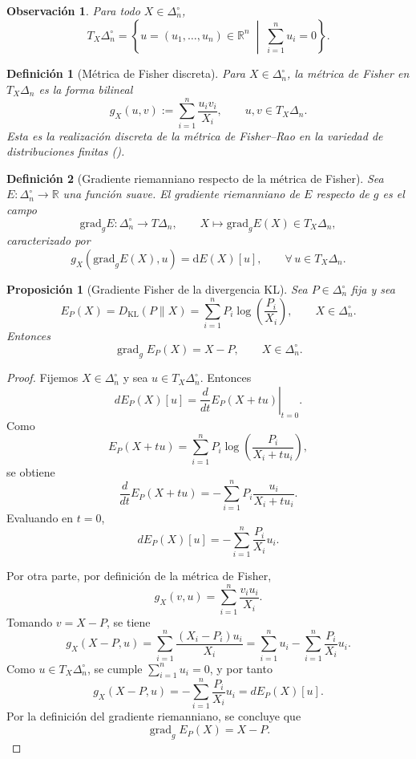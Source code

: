 ﻿\documentclass[12pt]{article}
\newtheorem{definicion}{Definición}[section]
\newtheorem{proposicion}{Proposición}[section]
\newtheorem{observacion}{Observación}[section]
\begin{document}
\begin{observacion}
Para todo $X\in\Delta_n^\circ$,
\[
T_X\Delta_n^\circ
=
\left\{
u=(u_1,\dots,u_n)\in\mathbb R^n
\;\middle|\;
\sum_{i=1}^n u_i=0
\right\}.
\]
\end{observacion}

\begin{definicion}[Métrica de Fisher discreta]\label{def:Fisher}
Para $X\in\Delta_n^\circ$, la \emph{métrica de Fisher} en $T_X\Delta_n$ es la forma bilineal
\[
g_X(u,v)
:=
\sum_{i=1}^n \frac{u_i v_i}{X_i},
\qquad
u,v\in T_X\Delta_n.
\]
Esta es la realización discreta de la métrica de Fisher--Rao en la variedad de distribuciones finitas (\cite{Chentsov1982,AmariNagaoka2000,Amari2016}).
\end{definicion}

\begin{definicion}[Gradiente riemanniano respecto de la métrica de Fisher]\label{def:gradienteFisher}
Sea $E:\Delta_n^\circ\to\mathbb R$ una función suave. El \emph{gradiente riemanniano} de $E$ respecto de $g$ es el campo
\[
\mathrm{grad}_gE:\Delta_n^\circ\to T\Delta_n,
\qquad
X\mapsto \mathrm{grad}_gE(X)\in T_X\Delta_n,
\]
caracterizado por
\[
g_X(\mathrm{grad}_gE(X),u)=\mathrm dE(X)[u],
\qquad
\forall\,u\in T_X\Delta_n.
\]
\end{definicion}
\begin{proposicion}[Gradiente Fisher de la divergencia KL]\label{prop:gradKL}
Sea $P\in\Delta_n^\circ$ fija y sea
\[
E_P(X)=D_{\mathrm{KL}}(P\|X)=\sum_{i=1}^n P_i \log\!\left(\frac{P_i}{X_i}\right),
\qquad X\in\Delta_n^\circ.
\]
Entonces
\[
\operatorname{grad}_g E_P(X)=X-P,
\qquad X\in\Delta_n^\circ.
\]
\end{proposicion}

\begin{proof}
Fijemos $X\in\Delta_n^\circ$ y sea $u\in T_X\Delta_n^\circ$. Entonces
\[
dE_P(X)[u]
=
\left.\frac{d}{dt}E_P(X+tu)\right|_{t=0}.
\]
Como
\[
E_P(X+tu)
=
\sum_{i=1}^n P_i \log\!\left(\frac{P_i}{X_i+tu_i}\right),
\]
se obtiene
\[
\frac{d}{dt}E_P(X+tu)
=
-\sum_{i=1}^n P_i \frac{u_i}{X_i+tu_i}.
\]
Evaluando en $t=0$,
\[
dE_P(X)[u]
=
-\sum_{i=1}^n \frac{P_i}{X_i}u_i.
\]

Por otra parte, por definición de la métrica de Fisher,
\[
g_X(v,u)=\sum_{i=1}^n \frac{v_i u_i}{X_i}.
\]
Tomando $v=X-P$, se tiene
\[
g_X(X-P,u)
=
\sum_{i=1}^n \frac{(X_i-P_i)u_i}{X_i}
=
\sum_{i=1}^n u_i - \sum_{i=1}^n \frac{P_i}{X_i}u_i.
\]
Como $u\in T_X\Delta_n^\circ$, se cumple $\sum_{i=1}^n u_i=0$, y por tanto
\[
g_X(X-P,u)
=
-\sum_{i=1}^n \frac{P_i}{X_i}u_i
=
dE_P(X)[u].
\]
Por la definición del gradiente riemanniano, se concluye que
\[
\operatorname{grad}_g E_P(X)=X-P.
\]
\end{proof}
\end{document}

